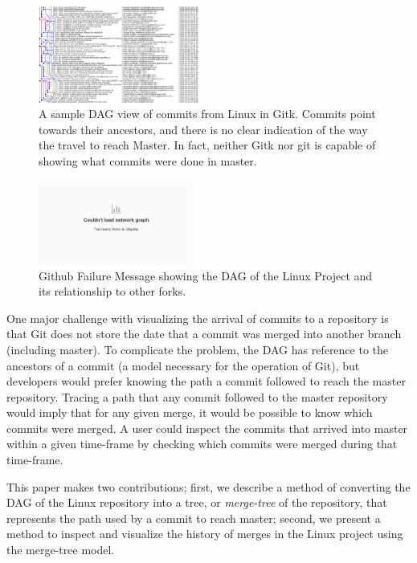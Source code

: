 \documentclass[conference, draftclsnofoot, draft]{IEEEtran}
\begin{document}
\begin{figure}
        \centering
        \includegraphics[width=0.47\textwidth]{figures/gitk.png}
        \caption{A sample DAG view of commits from Linux in Gitk. Commits point
                towards their ancestors, and there is no clear indication of the way
                the travel to reach Master. In fact, neither Gitk nor git is capable
                of showing what commits were done in master.}
        \label{fig:gitk}
\end{figure}

\begin{figure}
        \centering
        \includegraphics[width=0.45\textwidth]{figures/github_viewer.png}
        \caption{Github Failure Message showing the DAG of the Linux Project and its
                relationship to other forks.}
        \label{fig:gitfail}
\end{figure}

One major challenge with visualizing the arrival of commits to a repository is that
Git does not store the date that a commit was merged into another branch (including
master). To complicate the problem, the DAG has reference to the ancestors of a
commit (a model necessary for the operation of Git), but developers would prefer
knowing the path a commit followed to reach the master repository. Tracing a path
that any commit followed to the master repository would imply that for any given
merge, it would be possible to know which commits were merged. A user could inspect
the commits that arrived into master within a given time-frame by checking which
commits were merged during that time-frame.

This paper makes two contributions; first, we describe a method of converting the
DAG of the Linux repository into a tree, or \emph{merge-tree} of the repository,
that represents the path used by a commit to reach master; second, we present a
method to inspect and visualize the history of merges in the Linux project using the
merge-tree model.
\end{document}
